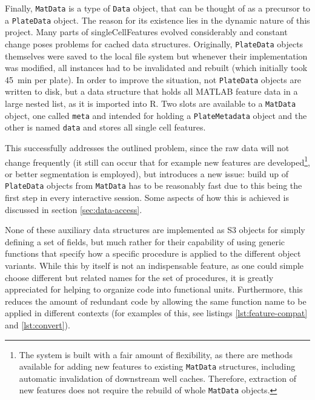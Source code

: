 Finally, \texttt{MatData} is a type of \texttt{Data} object, that can be thought of as a precursor to a \texttt{PlateData} object. The reason for its existence lies in the dynamic nature of this project. Many parts of singleCellFeatures evolved considerably and constant change poses problems for cached data structures. Originally, \texttt{PlateData} objects themselves were saved to the local file system but whenever their implementation was modified, all instances had to be invalidated and rebuilt (which initially took \tilde\SI{45}{\minute} per plate). In order to improve the situation, not \texttt{PlateData} objects are written to disk, but a data structure that holds all MATLAB feature data in a large nested list, as it is imported into R. Two slots are available to a \texttt{MatData} object, one called \texttt{meta} and intended for holding a \texttt{PlateMetadata} object and the other is named \texttt{data} and stores all single cell features.

This successfully addresses the outlined problem, since the raw data will not change frequently (it still can occur that for example new features are developed\footnote{The system is built with a fair amount of flexibility, as there are methods available for adding new features to existing \texttt{MatData} structures, including automatic invalidation of downstream well caches. Therefore, extraction of new features does not require the rebuild of whole \texttt{MatData} objects.}, or better segmentation is employed), but introduces a new issue: build up of \texttt{PlateData} objects from \texttt{MatData} has to be reasonably fast due to this being the first step in every interactive session. Some aspects of how this is achieved is discussed in section \ref{sec:data-access}.

None of these auxiliary data structures are implemented as S3 objects for simply defining a set of fields, but much rather for their capability of using generic functions that specify how a specific procedure is applied to the different object variants. While this by itself is not an indispensable feature, as one could simple choose different but related names for the set of procedures, it is greatly appreciated for helping to organize code into functional units. Furthermore, this reduces the amount of redundant code by allowing the same function name to be applied in different contexts (for examples of this, see listings \ref{lst:feature-compat} and \ref{lst:convert}).

